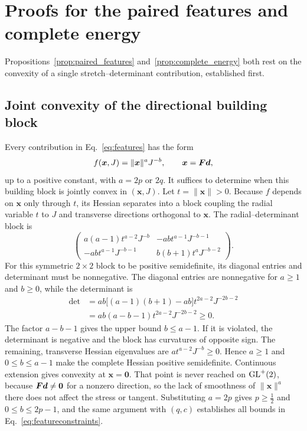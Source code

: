 \section{Proofs for the paired features and complete energy}
\label{app:convex}
Propositions~\ref{prop:paired_features} and~\ref{prop:complete_energy} both rest on the convexity of a single stretch--determinant contribution, established first.

\subsection{Joint convexity of the directional building block}
Every contribution in Eq.~\eqref{eq:features} has the form
\begin{equation}
 f(\bm x,J)=\|\bm x\|^aJ^{-b},
 \qquad \bm x=\bm F\bm d,
\end{equation}
up to a positive constant, with $a=2p$ or $2q$. It suffices to determine when this building block is jointly convex in $(\bm x,J)$. Let $t=\|\bm x\|>0$. Because $f$ depends on $\bm x$ only through $t$, its Hessian separates into a block coupling the radial variable $t$ to $J$ and transverse directions orthogonal to $\bm x$. The radial--determinant block is
\begin{equation}
 \begin{pmatrix}
 a(a-1)t^{a-2}J^{-b} & -ab t^{a-1}J^{-b-1}\\
 -ab t^{a-1}J^{-b-1} & b(b+1)t^aJ^{-b-2}
 \end{pmatrix}.
\end{equation}
For this symmetric $2\times2$ block to be positive semidefinite, its diagonal entries and determinant must be nonnegative. The diagonal entries are nonnegative for $a\geq1$ and $b\geq0$, while the determinant is
\begin{align}
 \det &=ab\bigl[(a-1)(b+1)-ab\bigr]t^{2a-2}J^{-2b-2}\nonumber\\
 &=ab(a-b-1)t^{2a-2}J^{-2b-2}\geq0.
\end{align}
The factor $a-b-1$ gives the upper bound $b\leq a-1$. If it is violated, the determinant is negative and the block has curvatures of opposite sign. The remaining, transverse Hessian eigenvalues are $a t^{a-2}J^{-b}\geq0$. Hence $a\geq1$ and $0\leq b\leq a-1$ make the complete Hessian positive semidefinite. Continuous extension gives convexity at $\bm x=\bm0$. That point is never reached on $\mathrm{GL}^{+}(2)$, because $\bm F\bm d\neq\bm0$ for a nonzero direction, so the lack of smoothness of $\|\bm x\|^a$ there does not affect the stress or tangent. Substituting $a=2p$ gives $p\geq\tfrac12$ and $0\leq b\leq2p-1$, and the same argument with $(q,c)$ establishes all bounds in Eq.~\eqref{eq:featureconstraints}.

